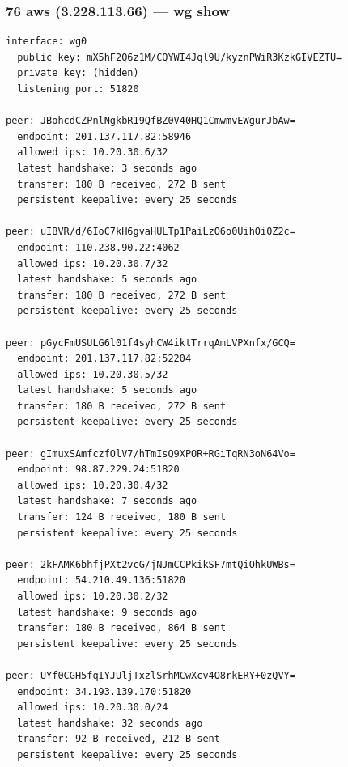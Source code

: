 \documentclass[11pt,a4paper]{article}
\begin{document}
\subsubsection*{76 aws (3.228.113.66) — wg show}
\begin{lstlisting}
interface: wg0
  public key: mX5hF2Q6z1M/CQYWI4Jql9U/kyznPWiR3KzkGIVEZTU=
  private key: (hidden)
  listening port: 51820

peer: JBohcdCZPnlNgkbR19QfBZ0V40HQ1CmwmvEWgurJbAw=
  endpoint: 201.137.117.82:58946
  allowed ips: 10.20.30.6/32
  latest handshake: 3 seconds ago
  transfer: 180 B received, 272 B sent
  persistent keepalive: every 25 seconds

peer: uIBVR/d/6IoC7kH6gvaHULTp1PaiLzO6o0UihOi0Z2c=
  endpoint: 110.238.90.22:4062
  allowed ips: 10.20.30.7/32
  latest handshake: 5 seconds ago
  transfer: 180 B received, 272 B sent
  persistent keepalive: every 25 seconds

peer: pGycFmUSULG6l01f4syhCW4iktTrrqAmLVPXnfx/GCQ=
  endpoint: 201.137.117.82:52204
  allowed ips: 10.20.30.5/32
  latest handshake: 5 seconds ago
  transfer: 180 B received, 272 B sent
  persistent keepalive: every 25 seconds

peer: gImuxSAmfczfOlV7/hTmIsQ9XPOR+RGiTqRN3oN64Vo=
  endpoint: 98.87.229.24:51820
  allowed ips: 10.20.30.4/32
  latest handshake: 7 seconds ago
  transfer: 124 B received, 180 B sent
  persistent keepalive: every 25 seconds

peer: 2kFAMK6bhfjPXt2vcG/jNJmCCPkikSF7mtQiOhkUWBs=
  endpoint: 54.210.49.136:51820
  allowed ips: 10.20.30.2/32
  latest handshake: 9 seconds ago
  transfer: 180 B received, 864 B sent
  persistent keepalive: every 25 seconds

peer: UYf0CGH5fqIYJUljTxzlSrhMCwXcv4O8rkERY+0zQVY=
  endpoint: 34.193.139.170:51820
  allowed ips: 10.20.30.0/24
  latest handshake: 32 seconds ago
  transfer: 92 B received, 212 B sent
  persistent keepalive: every 25 seconds

\end{lstlisting}
\end{document}
